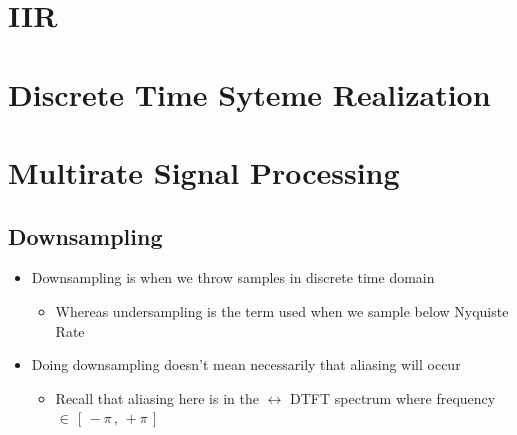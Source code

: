 \documentclass[12pt,a4paper]{book}
\begin{document}


\chapter{IIR}




\chapter{Discrete Time Syteme Realization}
\label{Chap:DT_Impementation}


\chapter{Multirate Signal Processing}


\section{Downsampling}

\begin{itemize}
    
\item Downsampling is when we throw samples in discrete time domain

    \begin{itemize}
        \item Whereas undersampling is the term used when we sample below Nyquiste Rate
    \end{itemize}

\item Doing downsampling doesn't mean necessarily that aliasing will occur
    
    \begin{itemize}
        \item Recall that aliasing here is in the  $\leftrightarrow$ DTFT spectrum where frequency $\in \, [ \, -\pi \, , \, +\pi \, ]$
    \end{itemize}


\end{itemize}
\end{document}
